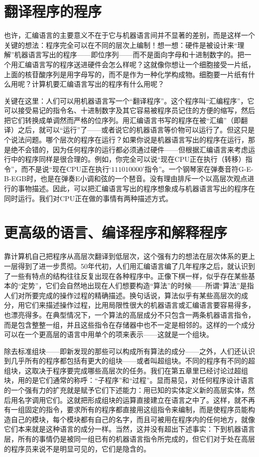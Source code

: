 \section{翻译程序的程序}

也许，汇编语言的主要意义不在于它与机器语言间并不显著的差别，而是这样一个关键的想法：程序完全可以在不同的层次上编制！想一想：硬件是被设计来“理解”机器语言写出的程序——即位序列——而不是面向字母和十进制数字的。把一个用汇编语言写的程序送进硬件会怎么样呢？这就像你想让一个细胞接受一片纸，上面的核苷酸序列是用字母写的，而不是作为一种化学构成物。细胞要一片纸有什么用呢？计算机要汇编语言写出的程序有什么用呢？

关键在这里：人们可以用机器语言写一个“翻译程序”。这个程序叫“汇编程序”，它可以接受易记的指令名、十进制数字及其它容易被程序员记住的方便的缩写，然后把它们转换成单调然而严格的位序列。用汇编语言书写的程序在被“汇编”（即翻译）之后，就可以“运行”了——或者说它的机器语言等价物可以运行了。但这只是个说法问题。哪个层次的程序在运行？如果你说是机器语言写出的程序在运行，那是绝不会错的，因为任何程序的运行都必须通过硬件——但根据汇编语言来考虑运行中的程序同样是很合理的。例如，你完全可以说“现在CPU正在执行（转移）指令”，而不是说“现在CPU正在执行‘$111010000$’指令”。一个钢琴家在弹奏音符G-E-B-EGB时，也是在弹奏E小调和弦的一个琶音。没有理由排斥一个以高层次观点进行的事物描述。因此，可以把汇编语言写出的程序想象成与机器语言写出的程序在同时运行。我们对CPU正在做的事情有两种描述方式。

\section{更高级的语言、编译程序和解释程序}

靠计算机自己把程序从高层次翻译到低层次，这个强有力的想法在层次体系的更上一层得到了进一步贯彻。50年代初，人们用汇编语言编了几年程序之后，就认识到了一些有特点的结构往往反复出现在各种程序中。正像下棋一样，似乎存在某些基本的“定势”，它们会自然地出现在人们想要构造“算法”的时候——所谓“算法”是指人们对所要完成的操作过程的精确描述。换句话说，算法似乎有某些高层次的成分，用它们来描述操作过程，比用局限性很大的机器语言或汇编语言要容易得多，也漂亮得多。在典型情况下，一个算法的高层成分不只包含一两条机器语言指令，而是包含整整一组，并且这些指令在存储器中也不一定是相邻的。这样的一个成分可以在一个更高层的语言中用单个的项来表示——这就是一个组块。

除去标准组块——即新发现的那些可以构成所有算法的成分——之外，人们还认识到几乎所有的程序都包括有更大的组块——或者叫超组块。不同的程序有不同的超组块，这取决于程序要完成哪些高层次的任务。我们在第五章里已经讨论过超组块，用的是它们通常的称呼：“子程序”和“过程”。显而易见，对任何程序设计语言的一个强有力的扩充就是赋予它们下述能力：用已知的实体定义新的高层实体，然后用名字调用它们。这就把形成组块的运算直接建立在语言之中了。这样，就不再有一组固定的指令，要求所有的程序都直接用这组指令来编制，而是使程序员能构造自己的模块，每个模块都有自己的名字，而且可被用在程序内的任何地方，就像它们本来就是这种语言的成分一样。当然，这并没有超出下述事实：下到机器语言层，所有的事情仍是被同一组已有的机器语言指令所完成的，但它们对于处在高层的程序员来说不是明显可见的，它们是隐含的。

